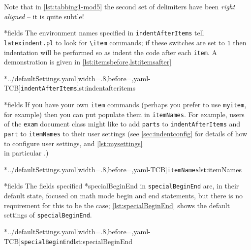 	Note that in \cref{lst:tabbing1-mod5} the second set of delimiters have been
	\emph{right aligned} -- it is quite subtle!

*{fields}
	The environment names specified in \texttt{indentAfterItems} tell \texttt{latexindent.pl}
	to look for \lstinline!\item! commands; if these switches are set to
	\texttt{1} then indentation will be performed so as indent the code after
	each \texttt{item}. A demonstration is given in \cref{lst:itemsbefore,lst:itemsafter}

	\begin{cmhtcbraster}[raster columns=3,
			raster left skip=-3.5cm,
			raster right skip=-2cm,
			raster column skip=.03\linewidth]
		\cmhlistingsfromfile[style=indentAfterItems]*{../defaultSettings.yaml}[width=.8\linewidth,before=\centering,yaml-TCB]{\texttt{indentAfterItems}}{lst:indentafteritems}
	\end{cmhtcbraster}

*{fields}
	If you have your own \texttt{item} commands (perhaps you prefer to use
	\texttt{myitem}, for example) then you can put populate them in
	\texttt{itemNames}. For example, users of the \texttt{exam} document class
	might like to add \texttt{parts} to \texttt{indentAfterItems} and
	\texttt{part} to \texttt{itemNames} to their user settings (see
	\vref{sec:indentconfig} for details of how to configure user settings, and
	\vref{lst:mysettings} \\ in particular \label{page:examsettings}.)

	\cmhlistingsfromfile[style=itemNames]*{../defaultSettings.yaml}[width=.8\linewidth,before=\centering,yaml-TCB]{\texttt{itemNames}}{lst:itemNames}

*{fields}\label{yaml:specialBeginEnd}
	The fields specified
	*{specialBeginEnd} in
	\texttt{specialBeginEnd} are, in their default state, focused on math mode begin and end
	statements, but there is no requirement for this to be the case; \cref{lst:specialBeginEnd}
	shows the default settings of \texttt{specialBeginEnd}.

	\cmhlistingsfromfile[style=specialBeginEnd]*{../defaultSettings.yaml}[width=.8\linewidth,before=\centering,yaml-TCB]{\texttt{specialBeginEnd}}{lst:specialBeginEnd}

